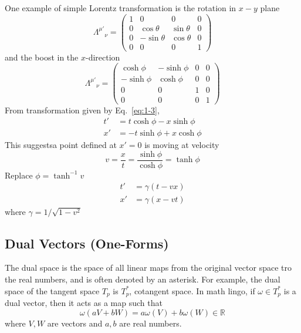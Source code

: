 \documentclass[11pt]{article}
\theoremstyle{definition}
\numberwithin{equation}{section}
\begin{document}
One example of simple Lorentz transformation is the rotation in $x-y$ plane
\begin{equation}
    \Lambda^{\mu'}_{\quad\nu} = \begin{pmatrix}
        1 & 0 & 0 & 0\\
        0 & \cos\theta & \sin\theta & 0\\
        0 & -\sin\theta & \cos\theta & 0\\
        0 & 0 & 0 & 1
    \end{pmatrix}
\end{equation}
and the boost in the $x$-direction
\begin{equation}
    \Lambda^{\mu'}_{\quad\nu} = \begin{pmatrix}
        \cosh\phi & -\sinh\phi & 0 & 0\\
        -\sinh\phi & \cosh\phi & 0 & 0\\
        0 & 0 & 1 & 0\\
        0 & 0 & 0 & 1
    \end{pmatrix}
    \label{eq:1-3}
\end{equation}
From transformation given by Eq.~\ref{eq:1-3},
\begin{equation}
    \begin{aligned}
        t' &= t\cosh\phi - x\sinh\phi\\
        x' &= -t\sinh\phi + x\cosh\phi
    \end{aligned}
\end{equation}
This suggestsa point defined at $x'=0$ is moving at velocity
\begin{equation}
    v = \frac{x}{t} = \frac{\sinh\phi}{\cosh\phi} = \tanh\phi
\end{equation}
Replace $\phi = \tanh^{-1}v$
\begin{equation}
    \begin{aligned}
        t' &= \gamma(t-vx)\\
        x' &= \gamma(x-vt)
    \end{aligned}
\end{equation}
where $\gamma = 1/\sqrt{1-v^2}$

\subsection{Dual Vectors (One-Forms)}
The dual space is the space of all linear maps from the original vector space tro the real numbers, and is often denoted by an asterisk. For example, the dual space of the tangent space $T_p$ is $T_p^*$, cotangent space. In math lingo, if $\omega\in T_p^*$ is a dual vector, then it acts as a map such that
\begin{equation}
    \omega(aV+bW)=a\omega(V)+b\omega(W)\in \mathbb{R}
\end{equation}
where $V, W$ are vectors and $a, b$ are real numbers.
\end{document}
